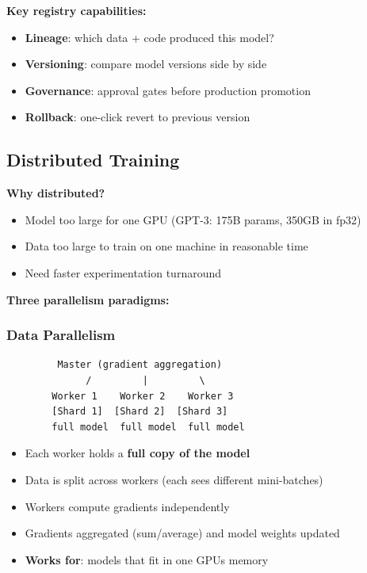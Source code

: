 \documentclass[11pt]{article}
\providecommand{\tightlist}{\setlength{\itemsep}{1pt}\setlength{\parskip}{0pt}}
\begin{document}
\textbf{Key registry capabilities:}

\begin{itemize}
\tightlist
\item
  \textbf{Lineage}: which data + code produced this model?
\item
  \textbf{Versioning}: compare model versions side by side
\item
  \textbf{Governance}: approval gates before production promotion
\item
  \textbf{Rollback}: one-click revert to previous version
\end{itemize}

\subsection{Distributed Training}\label{distributed-training}

\textbf{Why distributed?}

\begin{itemize}
\tightlist
\item
  Model too large for one GPU (GPT-3: 175B params, 350GB in fp32)
\item
  Data too large to train on one machine in reasonable time
\item
  Need faster experimentation turnaround
\end{itemize}

\textbf{Three parallelism paradigms:}

\subsubsection{Data Parallelism}\label{data-parallelism}

\setcodelang{}

\begin{verbatim}
         Master (gradient aggregation)
              /         |         \
        Worker 1    Worker 2    Worker 3
        [Shard 1]  [Shard 2]  [Shard 3]
        full model  full model  full model
\end{verbatim}

\begin{itemize}
\tightlist
\item
  Each worker holds a \textbf{full copy of the model}
\item
  Data is split across workers (each sees different mini-batches)
\item
  Workers compute gradients independently
\item
  Gradients aggregated (sum/average) and model weights updated
\item
  \textbf{Works for}: models that fit in one GPU\textquotesingle s memory
\end{itemize}
\end{document}
